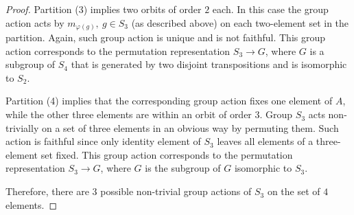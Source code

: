 \documentclass{article}
\theoremstyle{definition}
\begin{document}
\begin{proof}
Partition (3) implies two orbits of order $2$ each.
In this case the group action acts by $m_{\varphi(g)}, \> g \in S_3$ (as described above) on each two-element set in the partition.
Again, such group action is unique and is not faithful.
This group action corresponds to the permutation representation $S_3 \to G$, where $G$ is a subgroup of $S_4$ that is generated by two disjoint transpositions and is isomorphic to $S_2$.

Partition (4) implies that the corresponding group action fixes one element of $A$, while the other three elements are within an orbit of order $3$.
Group $S_3$ acts non-trivially on a set of three elements in an obvious way by permuting them.
Such action is faithful since only identity element of $S_3$ leaves all elements of a three-element set fixed.
This group action corresponds to the permutation representation $S_3 \to G$, where $G$ is the subgroup of $G$ isomorphic to $S_3$.

Therefore, there are $3$ possible non-trivial group actions of $S_3$ on the set of $4$ elements.

\end{proof}
\end{document}

